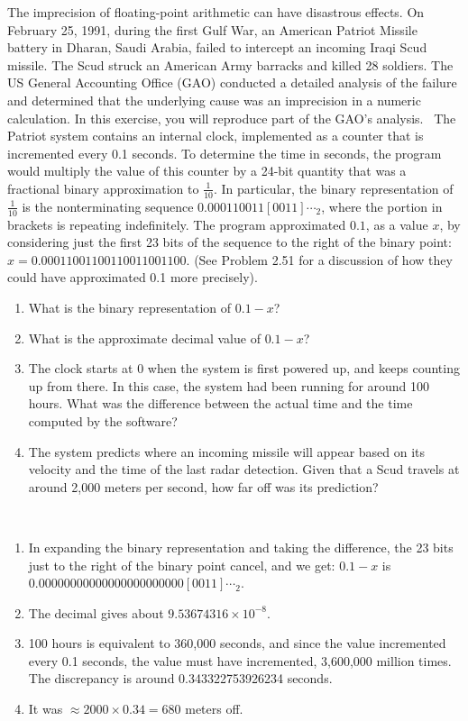 \documentclass[12pt]{article}
\newenvironment{ex}[2][Exercise]{\begin{trivlist}
		\item[\hskip \labelsep {\bfseries #1}\hskip \labelsep {\bfseries #2.}]}{\end{trivlist}}
\newenvironment{sol}[1][Solution]{\begin{trivlist}
		\item[\hskip \labelsep {\bfseries #1:}]}{\end{trivlist}}
\begin{document}
\begin{ex}{2.46}
	The imprecision of floating-point arithmetic can have disastrous effects. On
	February 25, 1991, during the first Gulf War, an American Patriot Missile battery
	in Dharan, Saudi Arabia, failed to intercept an incoming Iraqi Scud missile. The
	Scud struck an American Army barracks and killed 28 soldiers. The US General
	Accounting Office (GAO) conducted a detailed analysis of the failure and determined
	that the underlying cause was an imprecision in a numeric calculation. In this
	exercise, you will reproduce part of the GAO's analysis.
	\
	The Patriot system contains an internal clock, implemented as a counter that is
	incremented every 0.1 seconds. To determine the time in seconds, the program would
	multiply the value of this counter by a 24-bit quantity that was a fractional
	binary approximation to $\frac{1}{10}$. In particular, the binary representation
	of $\frac{1}{10}$ is the nonterminating sequence $0.000110011[0011]\cdots_2$,
	where the portion in brackets is repeating indefinitely. The program approximated
	$0.1$, as a value $x$, by considering just the first 23 bits of the sequence to
	the right of the binary point: $x=0.000 1100 1100 1100 1100 1100$. (See Problem 2.51
	for a discussion of how they could have approximated 0.1 more precisely).
	\begin{enumerate}[label=(\alph*)]
		\item What is the binary representation of $0.1-x$?
		\item What is the approximate decimal value of $0.1-x$?
		\item The clock starts at 0 when the system is first powered up, and keeps
		counting up from there. In this case, the system had been running for around
		100 hours. What was the difference between the actual time and the time
		computed by the software?
		\item The system predicts where an incoming missile will appear based on its
		velocity and the time of the last radar detection. Given that a Scud travels
		at around 2,000 meters per second, how far off was its prediction?
	\end{enumerate}
\end{ex}

\begin{sol}
	\
	\begin{enumerate}[label=(\alph*)]
		\item In expanding the binary representation and taking the difference, the
		23 bits just to the right of the binary point cancel, and we get:
		$0.1-x$ is $0.000 0000 0000 0000 0000 0000 [0011]\cdots_2$.
		\item The decimal gives about $9.53674316\times 10^{-8}$.
		\item 100 hours is equivalent to 360,000 seconds, and since the value incremented
		every 0.1 seconds, the value must have incremented, 3,600,000 million times.
		The discrepancy is around 0.343322753926234 seconds.
		\item It was $\approx2000\times 0.34=680$ meters off.
	\end{enumerate}
\end{sol}
\end{document}
